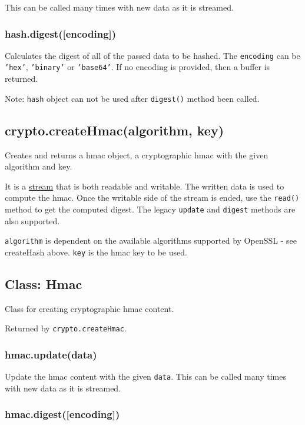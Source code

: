 This can be called many times with new data as it is streamed.

\subsubsection{hash.digest({[}encoding{]})}

Calculates the digest of all of the passed data to be hashed. The
\texttt{encoding} can be \texttt{'hex'}, \texttt{'binary'} or
\texttt{'base64'}. If no encoding is provided, then a buffer is
returned.

Note: \texttt{hash} object can not be used after \texttt{digest()}
method been called.

\subsection{crypto.createHmac(algorithm, key)}

Creates and returns a hmac object, a cryptographic hmac with the given
algorithm and key.

It is a \href{stream.html}{stream} that is both readable and writable.
The written data is used to compute the hmac. Once the writable side of
the stream is ended, use the \texttt{read()} method to get the computed
digest. The legacy \texttt{update} and \texttt{digest} methods are also
supported.

\texttt{algorithm} is dependent on the available algorithms supported by
OpenSSL - see createHash above. \texttt{key} is the hmac key to be used.

\subsection{Class: Hmac}

Class for creating cryptographic hmac content.

Returned by \texttt{crypto.createHmac}.

\subsubsection{hmac.update(data)}

Update the hmac content with the given \texttt{data}. This can be called
many times with new data as it is streamed.

\subsubsection{hmac.digest({[}encoding{]})}

